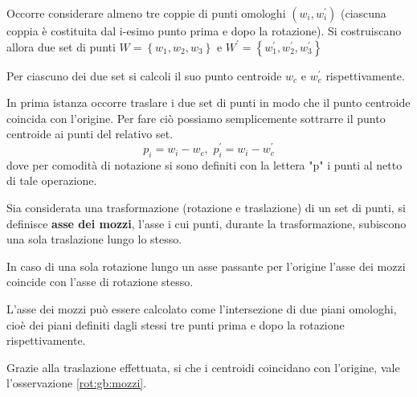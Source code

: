 Occorre considerare almeno tre coppie di punti omologhi $(w_i, w_i^{'})$ (ciascuna coppia è costituita dal i-esimo punto prima e dopo la rotazione). Si costruiscano allora due set di punti $W = \left\lbrace w_1, w_2, w_3 \right\rbrace$ e $W^{'} = \left\lbrace w_1^{'}, w_2^{'}, w_3^{'} \right\rbrace$

Per ciascuno dei due set si calcoli il suo punto centroide $w_c$ e $w_c^{'}$ rispettivamente.

In prima istanza occorre traslare i due set di punti in modo che il punto centroide coincida con l'origine. Per fare ciò possiamo semplicemente sottrarre il punto centroide ai punti del relativo set.
\begin{equation}
p_i = w_i - w_c, \, \, 
p_i^{'} = w_i - w_c^{'}
\end{equation}
dove per comodità di notazione si sono definiti con la lettera "p" i punti al netto di tale operazione.

\begin{defn}
	Sia considerata una trasformazione (rotazione e traslazione) di un set di punti, si definisce \textbf{asse dei mozzi}, l'asse i cui punti, durante la trasformazione, subiscono una sola traslazione lungo lo stesso. 
\end{defn}

\begin{obs}
	\label{rot:gb:mozzi}
	In caso di una sola rotazione lungo un asse passante per l'origine l'asse dei mozzi coincide con l'asse di rotazione stesso.
	
	L'asse dei mozzi può essere calcolato come l'intersezione di due piani omologhi, cioè dei piani definiti dagli stessi tre punti prima e dopo la rotazione rispettivamente.
\end{obs}

Grazie alla traslazione effettuata, si che i centroidi coincidano con l'origine, vale l'osservazione \ref{rot:gb:mozzi}.

